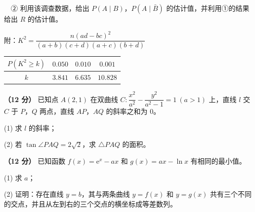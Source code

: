   　② 利用该调查数据，给出 $P(A\mid B)$，$P(A\mid\bar B)$ 的估计值，并利用①的结果给出 $R$ 的估计值。

  附：$K^{2}=\dfrac{n(ad-bc)^{2}}{(a+b)(c+d)(a+c)(b+d)}$

\begin{center}
\begin{tabular}{cccc}
\toprule
$P\left(K^{2}\ge k\right)$ & $0.050$ & $0.010$ & $0.001$ \\
\midrule
$k$ & $3.841$ & $6.635$ & $10.828$ \\
\bottomrule
\end{tabular}
\end{center}

\textbf{（12 分）} 已知点 $A(2,1)$ 在双曲线 $C:\dfrac{x^{2}}{a^{2}}-\dfrac{y^{2}}{a^{2}-1}=1\ (a>1)$ 上，直线 $l$ 交 $C$ 于 $P$，$Q$ 两点，直线 $AP$，$AQ$ 的斜率之和为 $0$。

  (1) 求 $l$ 的斜率；

  (2) 若 $\tan\angle PAQ=2\sqrt2$，求 $\triangle PAQ$ 的面积。

\textbf{（12 分）} 已知函数 $f(x)=\mathrm e^{x}-ax$ 和 $g(x)=ax-\ln x$ 有相同的最小值。

  (1) 求 $a$；

  (2) 证明：存在直线 $y=b$，其与两条曲线 $y=f(x)$ 和 $y=g(x)$ 共有三个不同的交点，并且从左到右的三个交点的横坐标成等差数列。

\par\medskip

